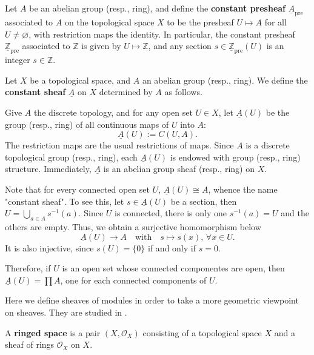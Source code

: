 \documentclass[11pt]{article}
\begin{document}
\begin{example}
    \label{eg: constant sheaf}
    \cite[Ex. II 1.1]{hartsAG}
    Let $A$ be an abelian group (resp., ring), and define the \textbf{constant presheaf} 
    $\underline{A}_{\mathrm{pre}}$ associated to $A$ on the 
    topological space $X$ to be the presheaf 
    $U \mapsto A$ for all $U \neq \varnothing$, 
    with restriction maps the identity. 
    In particular, the constant presheaf $\underline{\mathbb{Z}}_{\mathrm{pre}}$ 
    associated to $\mathbb{Z}$ is given by $U \mapsto \mathbb{Z}$, 
    and any section $s \in \underline{\mathbb{Z}}_{\mathrm{pre}}(U)$ 
    is an integer $s \in \mathbb{Z}$. 

    \cite[Example 1.0.3]{hartsAG} 
    Let $X$ be a topological space, and $A$ an abelian group (resp., ring). 
    We define the \textbf{constant sheaf} $\underline{A}$ on $X$ determined 
    by $A$ as follows. 

    Give $A$ the discrete topology, and for any open set 
    $U \in X$, let $\underline{A} (U)$ be the group (resp., ring) of all 
    continuous maps of $U$ into $A$: 
    $$\underline{A}(U):=C(U,A).$$ 
    The restriction maps are the usual restrictions 
    of maps. Since $ A $ is a discrete topological group (resp., ring), 
    each $ \underline{A}(U) $ is endowed with group (resp., ring) structure. 
    Immediately, $ \underline{A} $ is an abelian group sheaf (resp., ring) on $ X $. 

    Note that for every connected open set $U$, 
    $\underline{A} (U) \cong A$, whence the name "constant sheaf". 
    To see this, let $s \in \underline{A}(U)$ be a section, 
    then $U=\bigcup_{a \in A} s^{-1}(a)$. 
    Since $U$ is connected, there is only one $s^{-1}(a)=U$ 
    and the others are empty. 
    Thus, we obtain a surjective homomorphism below 
    $$\underline{A}(U) \to A \quad\text{with}\quad s \mapsto s(x),\, \forall x \in U. $$ 
    It is also injective, since $ s(U)=\{0\} $ if and only if 
    $ s =0 $. 

    Therefore, if $ U $ is an open set whose connected componentes 
    are open, then $ \underline{A}(U)= \prod A $, 
    one for each connected components of $ U $. 

\end{example}

Here we define sheaves of modules in order to take a 
more geometric viewpoint on sheaves. 
They are studied in \cite[II.5]{hartsAG}.

\begin{definition}
    A \textbf{ringed space} is a pair $ (X,\mathscr{O}_{X}) $ 
    consisting of a topological space $ X $ and a sheaf of rings 
    $ \mathscr{O}_{X} $ on $ X $. 
\end{definition}
\end{document}
